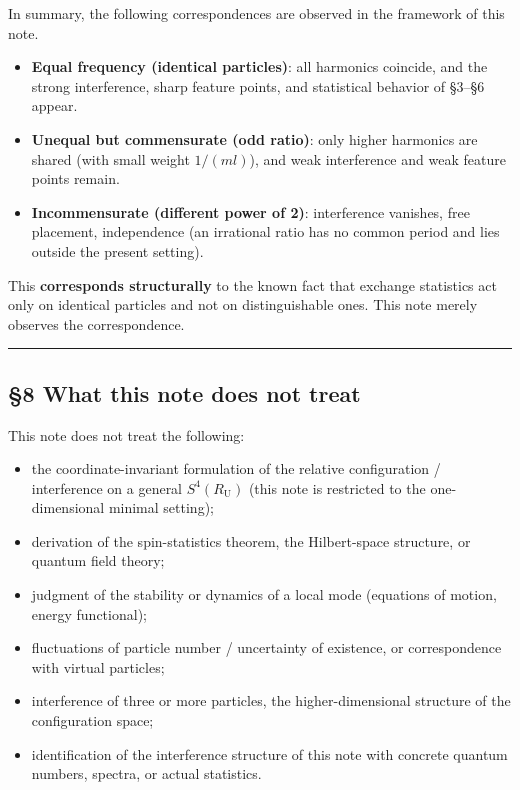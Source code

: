 \documentclass[
]{article}
\providecommand{\tightlist}{%
  \setlength{\itemsep}{0pt}\setlength{\parskip}{0pt}}
\begin{document}
In summary, the following correspondences are observed in the framework
of this note.

\begin{itemize}
\tightlist
\item
  \textbf{Equal frequency (identical particles)}: all harmonics
  coincide, and the strong interference, sharp feature points, and
  statistical behavior of §3--§6 appear.
\item
  \textbf{Unequal but commensurate (odd ratio)}: only higher harmonics
  are shared (with small weight \(1/(m l)\)), and weak interference and
  weak feature points remain.
\item
  \textbf{Incommensurate (different power of 2)}: interference vanishes,
  free placement, independence (an irrational ratio has no common period
  and lies outside the present setting).
\end{itemize}

This \textbf{corresponds structurally} to the known fact that exchange
statistics act only on identical particles and not on distinguishable
ones. This note merely observes the correspondence.

\begin{center}\rule{0.5\linewidth}{0.5pt}\end{center}

\subsection{§8 What this note does not
treat}\label{what-this-note-does-not-treat}

This note does not treat the following:

\begin{itemize}
\tightlist
\item
  the coordinate-invariant formulation of the relative configuration /
  interference on a general \(S^4(R_{\mathrm U})\) (this note is
  restricted to the one-dimensional minimal setting);
\item
  derivation of the spin-statistics theorem, the Hilbert-space
  structure, or quantum field theory;
\item
  judgment of the stability or dynamics of a local mode (equations of
  motion, energy functional);
\item
  fluctuations of particle number / uncertainty of existence, or
  correspondence with virtual particles;
\item
  interference of three or more particles, the higher-dimensional
  structure of the configuration space;
\item
  identification of the interference structure of this note with
  concrete quantum numbers, spectra, or actual statistics.
\end{itemize}
\end{document}
